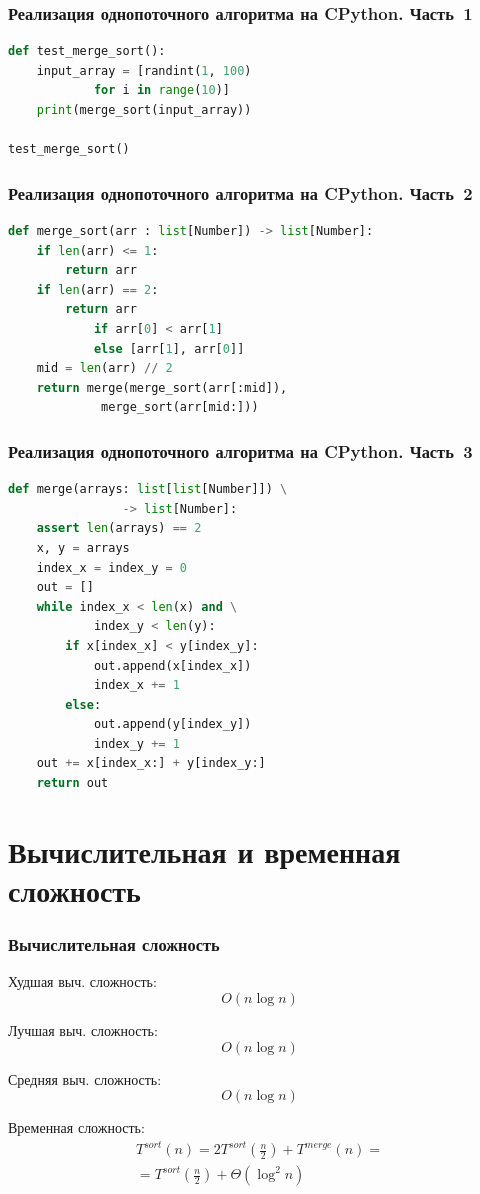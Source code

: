 \documentclass{beamer}
\begin{document}
	\begin{frame}[fragile]
		\frametitle{Реализация однопоточного алгоритма на CPython. Часть~1}
		\begin{lstlisting}[language=Python]		
def test_merge_sort():
	input_array = [randint(1, 100) 
			for i in range(10)]
	print(merge_sort(input_array))

test_merge_sort()
		\end{lstlisting}
	
	\end{frame}

	\begin{frame}[fragile]
		\frametitle{Реализация однопоточного алгоритма на CPython. Часть~2}
		\begin{lstlisting}[language=Python]		
def merge_sort(arr : list[Number]) -> list[Number]:
	if len(arr) <= 1:
		return arr
	if len(arr) == 2:
		return arr 
			if arr[0] < arr[1] 
			else [arr[1], arr[0]]
	mid = len(arr) // 2
	return merge(merge_sort(arr[:mid]), 
		     merge_sort(arr[mid:]))
		\end{lstlisting}
	
	\end{frame}

	\begin{frame}[fragile]
		\frametitle{Реализация однопоточного алгоритма на CPython. Часть~3}
		\begin{lstlisting}[language=Python]		
def merge(arrays: list[list[Number]]) \
				-> list[Number]:
	assert len(arrays) == 2
	x, y = arrays
	index_x = index_y = 0
	out = []
	while index_x < len(x) and \
			index_y < len(y):
		if x[index_x] < y[index_y]:
			out.append(x[index_x])
			index_x += 1
		else:
			out.append(y[index_y])
			index_y += 1
	out += x[index_x:] + y[index_y:]
	return out
		\end{lstlisting}
	
	\end{frame}


	\section{Вычислительная и временная сложность}
	\begin{frame}
		\frametitle{Вычислительная сложность}
		
		Худшая выч. сложность:
		\begin{equation}
			O(n\log{}{n})
		\end{equation}
		
		Лучшая выч. сложность:
		\begin{equation}
			O(n\log{}{n})
		\end{equation}
		
		Средняя выч. сложность:
		\begin{equation}
			O(n\log{}{n})
		\end{equation}
	
		Временная сложность:
		\begin{multline}
			T^{sort}(n)=2T^{sort}\left(\frac{n}{2}\right)+T^{merge}(n)=\\=T^{sort}\left(\frac{n}{2}\right)+\Theta(\log^2{}{n})
		\end{multline}
	\end{frame}
	
\end{document}
